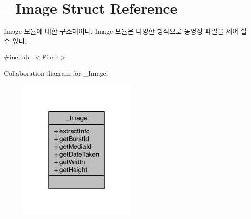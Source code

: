 \hypertarget{struct__Image}{\section{\-\_\-\-Image Struct Reference}
\label{struct__Image}
}


Image 모듈에 대한 구조체이다. Image 모듈은 다양한 방식으로 동영상 파일을 제어 할 수 있다.  




{\ttfamily \#include $<$File.\-h$>$}



Collaboration diagram for \-\_\-\-Image\-:\nopagebreak
\begin{figure}[H]
\begin{center}
\leavevmode
\includegraphics[width=166pt]{d1/d9b/struct__Image__coll__graph}
\end{center}
\end{figure}
